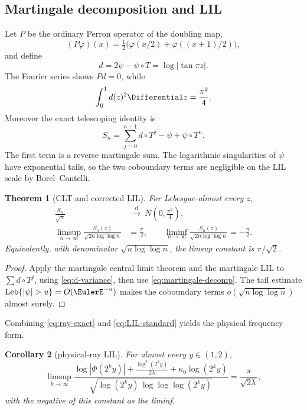 \documentclass[11pt,oneside]{article}
\newtheorem{theorem}{Theorem}[section]
\newtheorem{corollary}[theorem]{Corollary}
\theoremstyle{definition}
\theoremstyle{remark}
\newcommand{\T}{T}
\begin{document}
\subsection{Martingale decomposition and LIL}

Let \(P\) be the ordinary Perron operator of the doubling map,
\[
 (P\varphi)(x)=\tfrac12\bigl(\varphi(x/2)+\varphi((x+1)/2)\bigr),
\]
and define
\begin{equation}
 d=2\psi-\psi\circ\T=\log|\tan\pi z|.
 \label{eq:d-martingale}
\end{equation}
The Fourier series shows \(Pd=0\), while
\begin{equation}
 \int_0^1d(z)^2\Differential z=\frac{\pi^2}{4}.
 \label{eq:d-variance}
\end{equation}
Moreover the exact telescoping identity is
\begin{equation}
 S_n=\sum_{j=0}^{n-1}d\circ\T^j-\psi+\psi\circ\T^n.
 \label{eq:martingale-decomp}
\end{equation}
The first term is a reverse martingale sum.  The logarithmic singularities of
\(\psi\) have exponential tails, so the two coboundary terms are negligible on
the LIL scale by Borel--Cantelli.

\begin{theorem}[CLT and corrected LIL]
\label{thm:CLT-LIL}
For Lebesgue-almost every \(z\),
\begin{align}
 \frac{S_n}{\sqrt n}&\ \xrightarrow{\ \mathrm d\ }\
 N\!\left(0,\frac{\pi^2}{4}\right),
 \label{eq:CLT}\\
 \limsup_{n\to\infty}\frac{S_n(z)}{\sqrt{2n\log\log n}}
 &=\frac\pi2,
 \qquad
 \liminf_{n\to\infty}\frac{S_n(z)}{\sqrt{2n\log\log n}}
 =-\frac\pi2.
 \label{eq:LIL-standard}
\end{align}
Equivalently, with denominator \(\sqrt{n\log\log n}\), the limsup constant is
\(\pi/\sqrt2\).
\end{theorem}

\begin{proof}
Apply the martingale central limit theorem and the martingale LIL to
\(\sum d\circ\T^j\), using \eqref{eq:d-variance}, then use
\eqref{eq:martingale-decomp}.  The tail estimate
\(\operatorname{Leb}\{|\psi|>u\}=O(\EulerE^{-u})\) makes the coboundary terms
\(o(\sqrt{n\log\log n})\) almost surely.
\end{proof}

Combining \eqref{eq:ray-exact} and \eqref{eq:LIL-standard} yields the physical
frequency form.

\begin{corollary}[physical-ray LIL]
\label{cor:physical-LIL}
For almost every \(y\in(1,2)\),
\begin{equation}
 \limsup_{k\to\infty}
 \frac{\log|\Phi(2^ky)|+\frac{\log^2(2^ky)}{2\lambda}
       +\kappa_0\log(2^ky)}
 {\sqrt{\log(2^ky)\,\log\log\log(2^ky)}}
 =\frac{\pi}{\sqrt{2\lambda}},
 \label{eq:physical-LIL}
\end{equation}
with the negative of this constant as the liminf.
\end{corollary}
\end{document}
